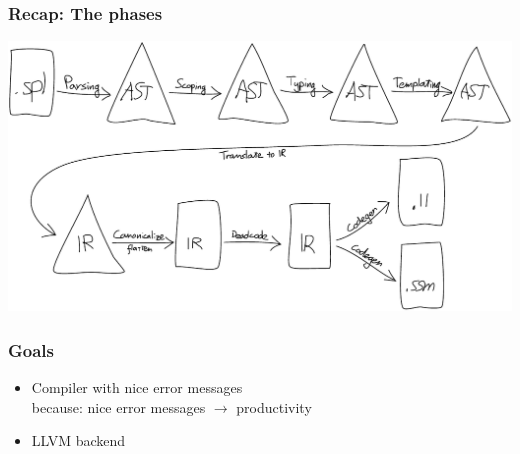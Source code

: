 \documentclass[14pt]{beamer}
\title{\splang}
\author{Wouter Geraedts \and Joshua Moerman}
\institute{Radboud Universiteit Nijmegen}
\date{}
\newcommand{\llvm}{\textsc{LLVM}\xspace}
\begin{document}
\begin{frame}
	\titlepage
\end{frame}

\begin{frame}
\begin{center}
	\frametitle{Recap: The phases}
	\includegraphics[width=\textwidth]{phases}
\end{center}
\end{frame}

\begin{frame}
	\frametitle{Goals}
	\begin{itemize}
		\item Compiler with nice error messages \\
			{\small because: nice error messages $\rightarrow$ productivity}
		\item \llvm backend
	\end{itemize}
\end{frame}
\end{document}
